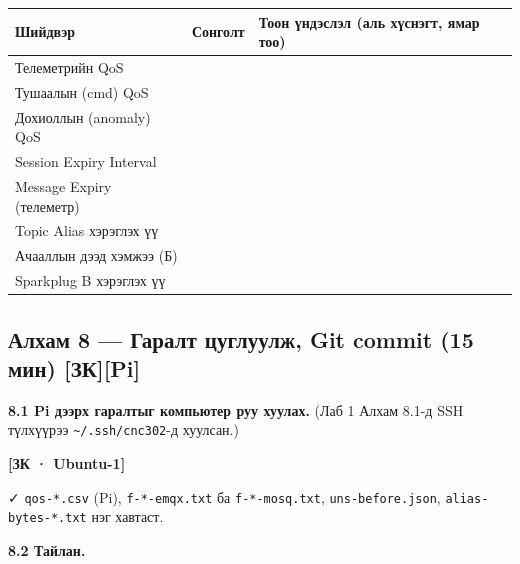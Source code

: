 \begingroup\scriptsize\begin{longtable}[]{@{}lll@{}}
\toprule
Шийдвэр & Сонголт & Тоон үндэслэл (аль хүснэгт, ямар тоо)\tabularnewline
\midrule
\endhead
Телеметрийн QoS & &\tabularnewline
Тушаалын (cmd) QoS & &\tabularnewline
Дохиоллын (anomaly) QoS & &\tabularnewline
Session Expiry Interval & &\tabularnewline
Message Expiry (телеметр) & &\tabularnewline
Topic Alias хэрэглэх үү & &\tabularnewline
Ачааллын дээд хэмжээ (Б) & &\tabularnewline
Sparkplug B хэрэглэх үү & &\tabularnewline
\bottomrule
\end{longtable}\endgroup

\hypertarget{ux430ux43bux445ux430ux43c-8-ux433ux430ux440ux430ux43bux442-ux446ux443ux433ux43bux443ux443ux43bux436-git-commit-15-ux43cux438ux43d-ux437ux43api}{%
\subsection{Алхам 8 --- Гаралт цуглуулж, Git commit (15 мин) {[}ЗК{]}{[}Pi{]}}\label{ux430ux43bux445ux430ux43c-8-ux433ux430ux440ux430ux43bux442-ux446ux443ux433ux43bux443ux443ux43bux436-git-commit-15-ux43cux438ux43d-ux437ux43api}}

\textbf{8.1 Pi дээрх гаралтыг компьютер руу хуулах.} (Лаб 1 Алхам 8.1-д SSH түлхүүрээ \texttt{\textasciitilde{}/.ssh/cnc302}-д хуулсан.)

\textbf{{[}ЗК · Ubuntu-1{]}}

\begin{Shaded}
\begin{Highlighting}[]
\end{Highlighting}
\end{Shaded}

✓ \texttt{qos-*.csv} (Pi), \texttt{f-*-emqx.txt} ба \texttt{f-*-mosq.txt}, \texttt{uns-before.json}, \texttt{alias-bytes-*.\allowbreak{}txt} нэг хавтаст.

\textbf{8.2 Тайлан.}

\begin{Shaded}
\begin{Highlighting}[]
\end{Highlighting}
\end{Shaded}


